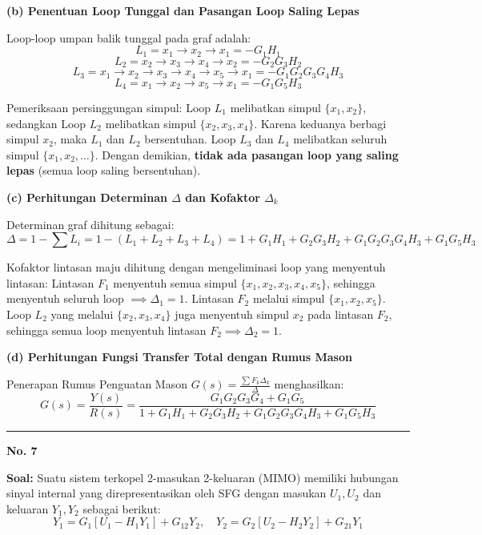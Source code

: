 \documentclass[11pt,a4paper]{article}
\begin{document}
\textbf{(b) Penentuan Loop Tunggal dan Pasangan Loop Saling Lepas}

Loop-loop umpan balik tunggal pada graf adalah:
$$L_1 = x_1 \to x_2 \to x_1 = -G_1 H_1$$
$$L_2 = x_2 \to x_3 \to x_4 \to x_2 = -G_2 G_3 H_2$$
$$L_3 = x_1 \to x_2 \to x_3 \to x_4 \to x_5 \to x_1 = -G_1 G_2 G_3 G_4 H_3$$
$$L_4 = x_1 \to x_2 \to x_5 \to x_1 = -G_1 G_5 H_3$$

Pemeriksaan persinggungan simpul: Loop $L_1$ melibatkan simpul $\{x_1, x_2\}$, sedangkan Loop $L_2$ melibatkan simpul $\{x_2, x_3, x_4\}$. Karena keduanya berbagi simpul $x_2$, maka $L_1$ dan $L_2$ bersentuhan. Loop $L_3$ dan $L_4$ melibatkan seluruh simpul $\{x_1, x_2, \dots\}$. Dengan demikian, \textbf{tidak ada pasangan loop yang saling lepas} (semua loop saling bersentuhan).

\textbf{(c) Perhitungan Determinan $\Delta$ dan Kofaktor $\Delta_k$}

Determinan graf dihitung sebagai:
$$\Delta = 1 - \sum L_i = 1 - (L_1 + L_2 + L_3 + L_4) = 1 + G_1 H_1 + G_2 G_3 H_2 + G_1 G_2 G_3 G_4 H_3 + G_1 G_5 H_3$$

Kofaktor lintasan maju dihitung dengan mengeliminasi loop yang menyentuh lintasan:
Lintasan $F_1$ menyentuh semua simpul $\{x_1, x_2, x_3, x_4, x_5\}$, sehingga menyentuh seluruh loop $\implies \Delta_1 = 1$.
Lintasan $F_2$ melalui simpul $\{x_1, x_2, x_5\}$. Loop $L_2$ yang melalui $\{x_2, x_3, x_4\}$ juga menyentuh simpul $x_2$ pada lintasan $F_2$, sehingga semua loop menyentuh lintasan $F_2 \implies \Delta_2 = 1$.

\textbf{(d) Perhitungan Fungsi Transfer Total dengan Rumus Mason}

Penerapan Rumus Penguatan Mason $G(s) = \frac{\sum F_k \Delta_k}{\Delta}$ menghasilkan:
$$G(s) = \frac{Y(s)}{R(s)} = \frac{G_1 G_2 G_3 G_4 + G_1 G_5}{1 + G_1 H_1 + G_2 G_3 H_2 + G_1 G_2 G_3 G_4 H_3 + G_1 G_5 H_3}$$

\vspace{12pt}
\hrule
\vspace{10pt}

\textbf{\large No. 7}

\textbf{Soal:}  
Suatu sistem terkopel 2-masukan 2-keluaran (MIMO) memiliki hubungan sinyal internal yang direpresentasikan oleh SFG dengan masukan $U_1, U_2$ dan keluaran $Y_1, Y_2$ sebagai berikut:
$$Y_1 = G_1 [U_1 - H_1 Y_1] + G_{12} Y_2, \quad Y_2 = G_2 [U_2 - H_2 Y_2] + G_{21} Y_1$$
\end{document}
